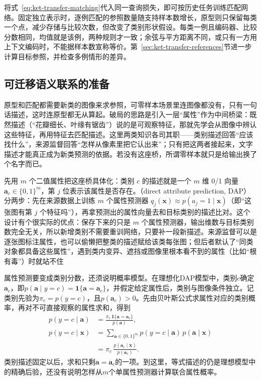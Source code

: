 将式~\eqref{eq:ket-transfer-matching}代入同一查询损失，即可按历史任务训练匹配网络。固定独立表示时，逐例匹配的参照数量随支持样本数增长，原型则只保留每类一个点，减少存储与比较次数，但改变了类别形状假设。每类一例且编码器、比较分数相同，均值就是该例，两种规则才一致；余弦与平方距离不同，或只有一方用上下文编码时，不能据样本数宣称等价。第~\ref{sec:ket-transfer-references}节进一步计算目标参照，并检查多例情形的差异。

\subsection{可迁移语义联系的准备}
\label{sec:ket-transfer-semantic-preparation}

原型和匹配都需要新类的图像来求参照，可零样本场景里连图像都没有，只有一句话描述，这时连原型都无从算起。破局的思路是引入一层“属性”作为中间桥梁：既然描述（“花瓣细长、叶缘有锯齿”）说的是可观察特征，那就先学会从图像中辨认这些特征，再用特征去匹配描述。这里两类知识各司其职——类别描述回答“应该找什么”，来源监督回答“怎样从像素里把它认出来”；只有把这两者接起来，文字描述才能真正成为新类预测的依据。若没有这座桥，所谓零样本就只是给输出换了个名字而已。

先用 $m$ 个二值属性把这座桥具体化：类别 $c$ 的描述就是一个 $m$ 维 0/1 向量 $\bm a_c\in\{0,1\}^m$，第 $j$ 位表示该属性是否存在。（direct attribute prediction, DAP）分两步：先在来源数据上训练 $m$ 个属性预测器 $q_j(\bm x)\approx p(a_j=1\mid\bm x)$（即“这张图有第 $j$ 个特征吗”），再拿预测出的属性向量去和目标类别的描述比对。这个设计有个很实际的优点：保存下来的只是 $m$ 个属性预测器，输出维数与目标类别数完全无关，所以新增类别不需要重训网络，只要补一段新描述。来源监督可以是逐张图标注属性，也可以偷懒把整类的描述赋给该类每张图；但后者默认了“同类对象都具备这些属性”，遇到类内变异、遮挡或图像里根本看不到的属性（比如“根有毒”）时就站不住

属性预测要变成类别分数，还须说明概率模型。在理想化DAP模型中，类别$c$确定$\bm a_c$，即$p(\bm a\mid y=c)=\mathbf1\{\bm a=\bm a_c\}$，并假定给定属性后，类别与图像条件独立。记类别先验为$\pi_c=p(y=c)$，且$p(\bm a_c)>0$。先由贝叶斯公式求属性对应的类别概率，再对不可直接观察的属性求和，得到
\begin{equation}
  \begin{aligned}
    p(y=c\mid\bm a)
      &=\frac{\pi_c\,\mathbf 1\{\bm a=\bm a_c\}}{p(\bm a)},\\
    p(y=c\mid\bm x)
      &=\sum_{\bm a\in\{0,1\}^m}
          p(y=c\mid\bm a)\,p(\bm a\mid\bm x)\\
      &=\pi_c\,\frac{p(\bm a_c\mid\bm x)}{p(\bm a_c)}.
  \end{aligned}
  \label{eq:ket-transfer-attribute-link}
\end{equation}
类别描述固定以后，求和只剩$\bm a=\bm a_c$的一项。到这里，等式描述的仍是理想模型中的精确后验，还没有说明怎样从$m$个单属性预测器计算联合属性概率。

